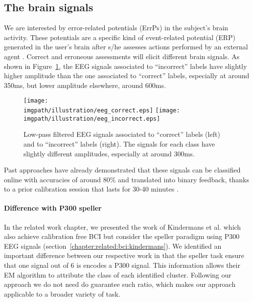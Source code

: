 \subsection{The brain signals}

We are interested by error-related potentials (ErrPs) in the subject's brain activity. These potentials are a specific kind of event-related potential (ERP) generated in the user's brain after s/he assesses actions performed by an external agent \cite{chavarriaga2010learning}. Correct and erroneous assessments will elicit different brain signals. As shown in Figure~\ref{fig:EEGsample}, the EEG signals associated to ``incorrect'' labels have slightly higher amplitude than the one associated to ``correct'' labels, especially at around 350ms, but lower amplitude elsewhere, around 600ms.

\begin{figure}[!htbp]
\centering
\texttt{[image: \\imgpath/illustration/eeg\_correct.eps]}
\texttt{[image: \\imgpath/illustration/eeg\_incorrect.eps]}
\caption{Low-pass filtered EEG signals associated to ``correct'' labels (left) and to ``incorrect'' labels (right). The signals for each class have slightly different amplitudes, especially at around 300ms.}
\label{fig:EEGsample}
\end{figure}

Past approaches have already demonstrated that these signals can be classified online with accuracies of around 80\% and translated into binary feedback, thanks to a prior calibration session that lasts for 30-40 minutes \cite{chavarriaga2010learning, iturrate2013task}.

\paragraph{Difference with P300 speller} In the related work chapter, we presented the work of Kindermans et al. which also achieve calibration free BCI but consider the speller paradigm using P300 EEG signals (section~\ref{chapter:related:bci:kindermans}). We identified an important difference between our respective work in that the speller task ensure that one signal out of 6 is encodes a P300 signal. This information allows their EM algorithm to attribute the class of each identified cluster. Following our approach we do not need do guarantee such ratio, which makes our approach applicable to a broader variety of task.

